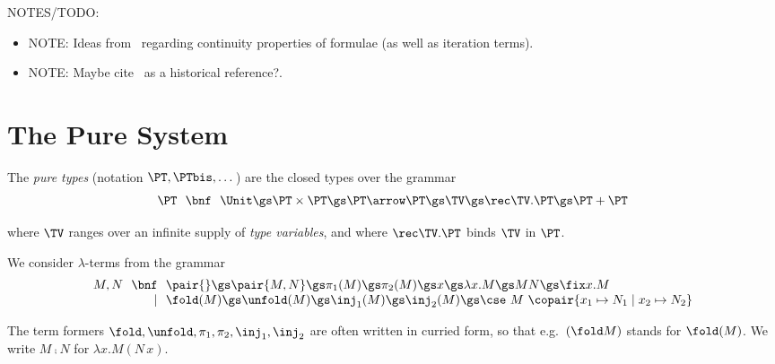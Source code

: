 \begin{colinpar}
NOTES/TODO:
\begin{itemize}
\item NOTE: Ideas from~\cite{jr21esop}
regarding continuity properties of formulae (as well as iteration terms).

\item NOTE: Maybe cite~\cite{smyth83icalp} as a historical reference?.
\end{itemize}
\end{colinpar}



\section{The Pure System}
\label{sec:pure}


The \emph{pure types}
(notation $\PT,\PTbis,\dots$) are
the closed types over the grammar
\[
\begin{array}{r @{~~} c @{~~} l}
    \PT
&   \bnf
&   \Unit
\gs \PT \times \PT
\gs \PT \arrow \PT
\gs \TV
\gs \rec \TV.\PT 
\gs \PT + \PT
\end{array}
\]

\noindent
where $\TV$ ranges over an infinite supply of \emph{type variables},
and where $\rec\TV.\PT$ binds $\TV$ in $\PT$.
 
We consider $\lambda$-terms from the grammar
\[
\begin{array}{r @{~~} r @{~~} l}
    M,N 
&   \bnf
&   \pair{}
\gs \pair{M,N}
\gs \pi_1(M)
\gs \pi_2(M)
\gs x
\gs \lambda x.M
\gs M N
\gs \fix x.M
\\
%
&   \mid
&   \fold(M)
\gs \unfold(M)
\gs \inj_1(M)
\gs \inj_2(M)
\gs \cse\ M\ \copair{x_1 \mapsto N_1 \mid x_2 \mapsto N_2}
\end{array}
\]

\noindent
The term formers $\fold, \unfold, \pi_1, \pi_2, \inj_1, \inj_2$
are often written in curried form,
so that e.g.\ $(\fold M)$ stands for $\fold(M)$.
We write $M \comp N$ for $\lambda x. M(N\, x)$.


